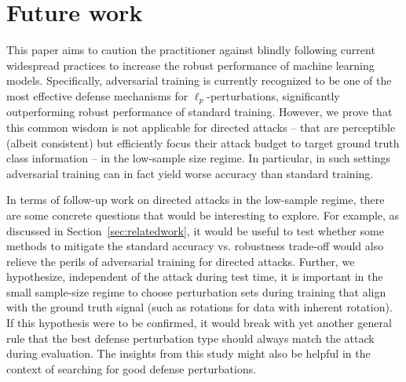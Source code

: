
\section{Future work}


This paper aims to caution the practitioner against blindly following
current widespread practices to increase the robust
performance of machine learning models.
Specifically, adversarial training is currently recognized to be one
of the most effective defense mechanisms for $\ell_p$-perturbations,
significantly outperforming robust performance of standard training.  However, we prove that
this common wisdom is not applicable for directed attacks -- that are perceptible (albeit consistent) but efficiently focus their
attack budget to target ground truth class information -- in the low-sample size regime.
In particular, in such settings adversarial training can in fact yield worse accuracy than standard training.






In terms of follow-up work on directed attacks in the low-sample
regime, there are some concrete questions that would be interesting to
explore.  For example, as discussed in Section~\ref{sec:relatedwork},
it would be useful to test whether some methods to mitigate the
standard accuracy vs. robustness trade-off would also relieve the
perils of adversarial training for directed attacks. Further, we
hypothesize, independent of the attack during test time, it is
important in the small sample-size regime to choose perturbation sets
during training that align with
the ground truth signal (such as rotations for data with inherent
rotation). If this hypothesis were to be confirmed, it would break
with yet another general rule that the best defense perturbation type
should always match the attack during evaluation.  The insights from
this study might also be helpful in the context of searching for
good defense perturbations.



